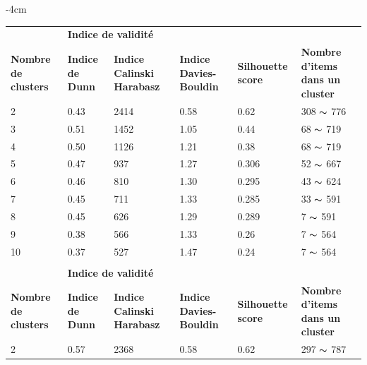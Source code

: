 \begin{table}[H]
	\centering
	\addtolength{\leftskip} {-4cm}
	\addtolength{\rightskip}{-4.5cm}
	\begin{tabular}{|m{2cm}|m{2cm}|m{2cm}|m{2cm}|m{2cm}|m{3cm}|}
	\hline
	\rowcolor{blueforest}
	\multicolumn{6}{|m{16cm}|}{\centering \color{white} \textbf{Kmeans clustering} } \\ \hline
	&  \multicolumn{4}{|m{8cm}|}{\centering \textbf{Indice de validité} } & \\ \hline
	\textbf{Nombre de clusters}  &   \textbf{Indice de Dunn} & \textbf{Indice Calinski Harabasz}& \textbf{Indice Davies-Bouldin} & \textbf{Silhouette score}  &  \textbf{Nombre d'items dans un cluster }\\ \hline
	2  & 0.43  & \cellcolor{gray!40} 2414  & \cellcolor{gray!40} 0.58   &  \cellcolor{gray!40} 0.62   & 308  \(\displaystyle \thicksim  \) 776  \\ \hline %
	3  & \cellcolor{gray!40} 0.51  & 1452  & 1.05   &  0.44   & 68   \(\displaystyle \thicksim  \) 719  \\ \hline
	4  & 0.50  & 1126  & 1.21   &  0.38   & 68   \(\displaystyle \thicksim  \) 719  \\ \hline
	5  & 0.47  & 937   & 1.27   &  0.306  & 52   \(\displaystyle \thicksim  \) 667  \\ \hline
	6  & 0.46  & 810   & 1.30   &  0.295  & 43   \(\displaystyle \thicksim  \) 624  \\ \hline
	7  & 0.45  & 711   & 1.33   &  0.285  & 33   \(\displaystyle \thicksim  \) 591  \\ \hline
	8  & 0.45  & 626   & 1.29   &  0.289  & 7    \(\displaystyle \thicksim  \) 591  \\ \hline
	9  & 0.38  & 566   & 1.33   &  0.26   & 7    \(\displaystyle \thicksim  \) 564  \\ \hline
	10 & 0.37  & 527   & 1.47   &  0.24   & 7    \(\displaystyle \thicksim  \) 564  \\ \hline \hline
	\rowcolor{blueforest}
	\multicolumn{6}{|m{16cm}|}{\centering \color{white} \textbf{Agglomérative clustering} } \\ \hline
	&  \multicolumn{4}{|m{8cm}|}{\centering \textbf{Indice de validité} } & \\ \hline
	\textbf{Nombre de clusters}  &   \textbf{Indice de Dunn} & \textbf{Indice Calinski Harabasz}& \textbf{Indice Davies-Bouldin} & \textbf{Silhouette score}  &  \textbf{Nombre d'items dans un cluster }\\ \hline
	2  & \cellcolor{gray!40} 0.57 & \cellcolor{gray!40} 2368 & \cellcolor{gray!40} 0.58   & \cellcolor{gray!40} 0.62    &  297  \(\displaystyle \thicksim  \)  787  \\ \hline 	

\end{tabular}
\end{table}
